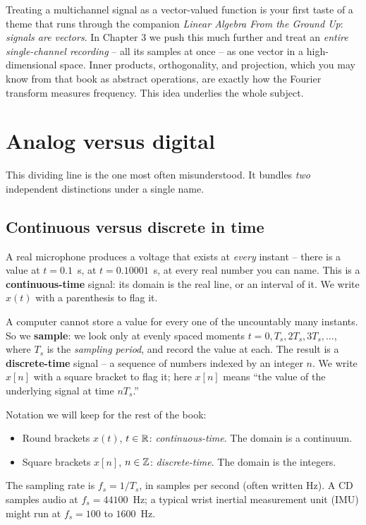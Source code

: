 \begin{connectionbox}
Treating a multichannel signal as a vector-valued function is your first taste of a theme that
runs through the companion \emph{Linear Algebra From the Ground Up}: \emph{signals are vectors}.
In Chapter 3 we push this much further and treat an \emph{entire single-channel recording} -- all
its samples at once -- as one vector in a high-dimensional space. Inner products, orthogonality,
and projection, which you may know from that book as abstract operations, are
exactly how the Fourier transform measures frequency. This idea underlies the
whole subject.
\end{connectionbox}

\section{Analog versus digital}
\label{ch01:analog-digital}

This dividing line is the one most often misunderstood. It bundles \emph{two} independent distinctions under a single name.

\subsection*{Continuous versus discrete in time}
A real microphone produces a voltage that exists at \emph{every} instant -- there is a value at
$t = 0.1$~s, at $t = 0.10001$~s, at every real number you can name. This is a
\textbf{continuous-time} signal: its domain is the real line, or an interval of it. We write
$x(t)$ with a parenthesis to flag it.

A computer cannot store a value for every one of the uncountably many instants. So we
\textbf{sample}: we look only at evenly spaced moments $t = 0, T_s, 2T_s, 3T_s, \dots$, where
$T_s$ is the \emph{sampling period}, and record the value at each. The result is a
\textbf{discrete-time} signal -- a sequence of numbers indexed by an integer $n$. We write
$x[n]$ with a square bracket to flag it; here $x[n]$ means ``the value of the underlying signal at
time $n T_s$.''

\begin{formalbox}
Notation we will keep for the rest of the book:
\begin{itemize}
\item Round brackets $x(t)$, $t \in \mathbb{R}$: \emph{continuous-time}. The domain is a continuum.
\item Square brackets $x[n]$, $n \in \mathbb{Z}$: \emph{discrete-time}. The domain is the integers.
\end{itemize}
The sampling rate is $f_s = 1/T_s$, in samples per second (often written Hz). A CD samples audio
at $f_s = 44100$~Hz; a typical wrist inertial measurement unit (IMU) might run at $f_s = 100$ to $1600$~Hz.
\end{formalbox}

